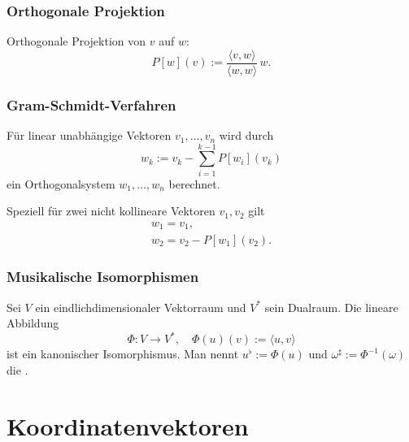 \subsubsection{Orthogonale Projektion}
Orthogonale Projektion von $v$ auf $w$:
\begin{equation}
P[w](v) := \frac{\langle v,w\rangle}{\langle w,w\rangle}\,w.
\end{equation}
\subsubsection{Gram-Schmidt-Verfahren}
Für linear unabhängige Vektoren $v_1,\ldots,v_n$
wird durch%
\begin{equation}
w_k := v_k - \sum_{i=1}^{k-1} P[w_i](v_k)
\end{equation}
ein Orthogonalsystem $w_1,\ldots,w_n$ berechnet.

Speziell für zwei nicht kollineare Vektoren $v_1,v_2$ gilt
\begin{gather}
w_1=v_1,\\
w_2=v_2-P[w_1](v_2).
\end{gather}

\newpage
\subsubsection{Musikalische Isomorphismen}
\begin{definition}
Sei $V$ ein eindlichdimensionaler Vektorraum und
$V^*$ sein Dualraum. Die lineare Abbildung
\begin{equation}
\Phi\colon V\to V^*,\quad \Phi(u)(v):=\langle u,v\rangle
\end{equation}
ist ein kanonischer Isomorphismus. Man nennt $u^\flat:=\Phi(u)$
und $\omega^\sharp:=\Phi^{-1}(\omega)$ die .
\end{definition}

\section{Koordinatenvektoren}
